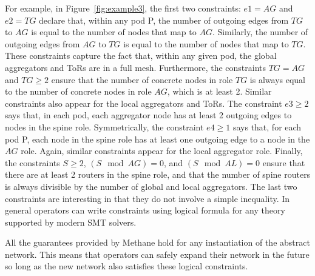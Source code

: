 \documentclass[numbers, 10pt, preprint]{sigplanconf}
\newcommand{\sysname}{{\small \sf Methane}\xspace}
\begin{document}
For example, in Figure~\ref{fig:example3}, the first two constraints: $e1 = AG$ and $e2 = TG$ declare that, within any pod P, the number of outgoing edges from $TG$ to $AG$ is equal to the number of nodes that map to $AG$. Similarly, the number of outgoing edges from $AG$ to $TG$ is equal to the number of nodes that map to $TG$. These constraints capture the fact that, within any given pod, the global aggregators and ToRs are in a full mesh. Furthermore, the constraints $TG = AG$ and $TG \geq 2$ ensure that the number of concrete nodes in role $TG$ is always equal to the number of concrete nodes in role $AG$, which is at least 2. Similar constraints also appear for the local aggregators and ToRs.
%
The constraint $e3 \geq 2$ says that, in each pod, each aggregator node has at least 2 outgoing edges to nodes in the spine role. Symmetrically, the constraint $e4 \geq 1$ says that, for each pod P, each node in the spine role has at least one outgoing edge to a node in the $AG$ role. Again, similar constraints appear for the local aggregator role. Finally, the constraints $S \geq 2$, $(S \mod AG) = 0$, and $(S \mod AL) = 0$ ensure that there are at least 2 routers in the spine role, and that the number of spine routers is always divisible by the number of global and local aggregators.
%
The last two constraints are interesting in that they do not involve a simple inequality. In general operators can write constraints using logical formula for any theory supported by modern SMT solvers.

All the guarantees provided by \sysname hold for any instantiation of the abstract network. This means that operators can safely expand their network in the future so long as the new network also satisfies these logical constraints.



%
\end{document}
